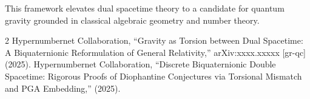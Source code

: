 \documentclass[dvipdfmx,11pt,a4paper]{article}
\begin{document}
This framework elevates dual spacetime theory to a candidate for quantum gravity grounded in classical algebraic geometry and number theory.


\begin{thebibliography}{2}
Hypernumbernet Collaboration, ``Gravity as Torsion between Dual Spacetime: A Biquaternionic Reformulation of General Relativity,'' arXiv:xxxx.xxxxx [gr-qc] (2025).
Hypernumbernet Collaboration, ``Discrete Biquaternionic Double Spacetime: Rigorous Proofs of Diophantine Conjectures via Torsional Mismatch and PGA Embedding,'' (2025).
\end{thebibliography}
\end{document}
